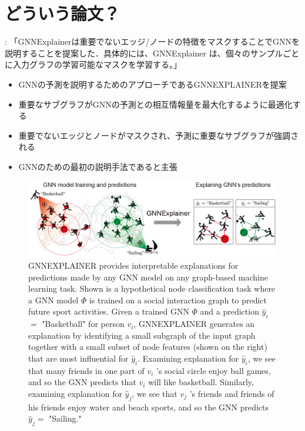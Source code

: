 \documentclass[a4paper,10pt]{ltjsarticle}
\newcommand{\1}{\mbox{1}\hspace{-0.25em}\mbox{l}}
\theoremstyle{definition}
\begin{document}
    \section{どういう論文？}
    \cite{li2022explainability}: 「GNNExplainerは重要でないエッジ/ノードの特徴をマスクすることでGNNを説明することを提案した．具体的には、GNNExplainer は、個々のサンプルごとに入力グラフの学習可能なマスクを学習する。」
    \begin{itemize}
        \item GNNの予測を説明するためのアプローチであるGNNEXPLAINERを提案
        \item 重要なサブグラフがGNNの予測との相互情報量を最大化するように最適化する
        \item 重要でないエッジとノードがマスクされ、予測に重要なサブグラフが強調される
        \item GNNのための最初の説明手法であると主張
    \end{itemize}
    \begin{figure}[H]
        \centering
        \includegraphics[width=120mm]{fig/gnnexplainer_fig1}
        \caption{
            GNNEXPLAINER provides interpretable explanations for predictions made by any GNN model on
            any graph-based machine learning task. Shown is a hypothetical node classification task where
            a GNN model $\Phi$ is trained on a social interaction graph to predict future sport activities.
            Given a trained GNN $\Phi$ and a prediction $\hat{y}_{i}$ $=$ "Basketball" for person $v_{i}$,
            GNNEXPLAINER generates an explanation by identifying a small subgraph of the input graph together
            with a small subset of node features (shown on the right) that are most influential for $\hat{y}_{i}$.
            Examining explanation for $\hat{y}_{i}$, we see that many friends in one part of $v_{i}$ 's social circle
            enjoy ball games, and so the GNN predicts that $v_{i}$ will like basketball. Similarly, examining
            explanation for $\hat{y}_{j}$, we see that $v_{j}$ 's friends and friends of his friends enjoy water and
            beach sports, and so the GNN predicts $\hat{y}_{j}=$ "Sailing."}
    \end{figure}
\end{document}
